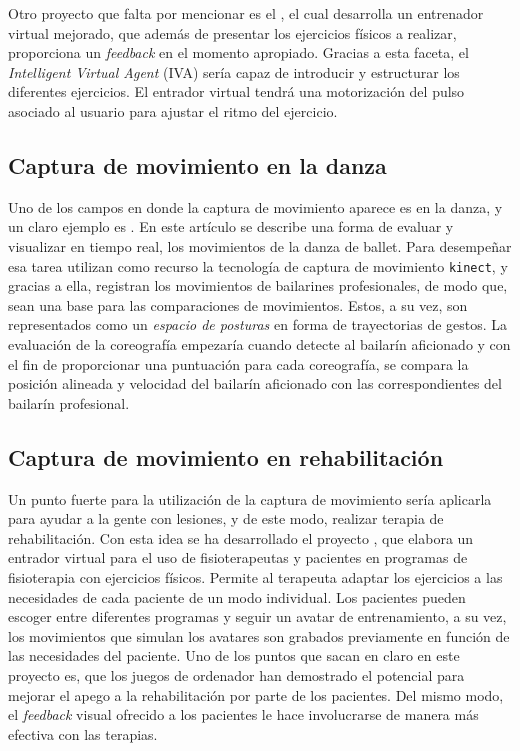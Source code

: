 Otro proyecto que falta por mencionar es el \cite{Ruttkay2008}, el cual desarrolla un entrenador virtual mejorado, que además de presentar los ejercicios físicos a realizar, proporciona un \textit{feedback} en el momento apropiado. Gracias a esta faceta, el \textit{Intelligent Virtual Agent} (IVA) sería capaz de introducir y estructurar los diferentes ejercicios. El entrador virtual tendrá una motorización del pulso asociado al usuario para ajustar el ritmo del ejercicio.

\subsection{Captura de movimiento en la danza}

Uno de los campos en donde la captura de movimiento aparece es en la danza, y un claro ejemplo es \cite{Kyan:2015:ABD:2753829.2735951}. En este artículo se describe una forma de evaluar y visualizar en tiempo real, los movimientos de la danza de ballet. Para desempeñar esa tarea utilizan como recurso la tecnología de captura de movimiento \texttt{kinect}, y gracias a ella, registran los movimientos de bailarines profesionales, de modo que, sean una base para las comparaciones de movimientos. Estos, a su vez, son representados como un \textit{espacio de posturas} en forma de trayectorias de gestos. La evaluación de la coreografía empezaría cuando detecte al bailarín aficionado y con el fin de proporcionar una puntuación para cada coreografía, se compara la posición alineada y velocidad del bailarín aficionado con las correspondientes del bailarín profesional.

\subsection{Captura de movimiento en rehabilitación}

Un punto fuerte para la utilización de la captura de movimiento sería aplicarla para ayudar a la gente con lesiones, y de este modo, realizar terapia de rehabilitación. Con esta idea se ha desarrollado el proyecto \cite{li2014development}, que elabora un entrador virtual para el uso de fisioterapeutas y pacientes en programas de fisioterapia con ejercicios físicos. Permite al terapeuta adaptar los ejercicios a las necesidades de cada paciente de un modo individual. Los pacientes pueden escoger entre diferentes programas y seguir un avatar de entrenamiento, a su vez, los movimientos que simulan los avatares son grabados previamente en función de las necesidades del paciente. Uno de los puntos que sacan en claro en este proyecto es, que los juegos de ordenador han demostrado el potencial para mejorar el apego a la rehabilitación por parte de los pacientes. Del mismo modo, el \textit{feedback} visual ofrecido a los pacientes le hace involucrarse de manera más efectiva con las terapias.

